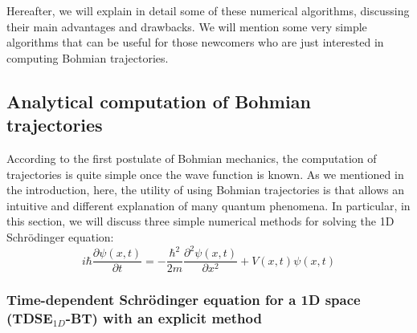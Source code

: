 \documentclass[onecolumn,nofootinbib, secnumarabic, amsmath, nobibnotes,12pt,aps,pra]{revtex4-1}
\begin{document}
Hereafter, we will explain in detail some of these numerical
algorithms, discussing their main advantages and drawbacks. We will
mention some very simple algorithms that can be useful for those
newcomers who are just interested in computing Bohmian trajectories.\enlargethispage{-1pc}


\subsection{Analytical computation of Bohmian trajectories}

According to the first postulate of Bohmian mechanics, the
computation of trajectories is quite simple once the wave function
is known.  As we mentioned in the introduction, here, the utility of
using Bohmian trajectories is that allows an intuitive and different
explanation of many quantum phenomena. In particular, in this
section, we will discuss three simple numerical methods for
solving the 1D Schr\"odinger equation:
\begin{equation}
\label{om.Schrodinger1Dappendix}
i \hbar \frac{\partial \psi(x,t)} {\partial t} = -\frac {\hbar^2} {2m} \frac{ {\partial}^2 \psi(x,t)} {\partial x^2} + V(x,t) \psi(x,t)
\end{equation}

\subsubsection{Time-dependent Schr\"odinger equation for a 1D space (TDSE$_{1D}$-BT) with an explicit method}
\label{timedependentexplicit}
\end{document}
